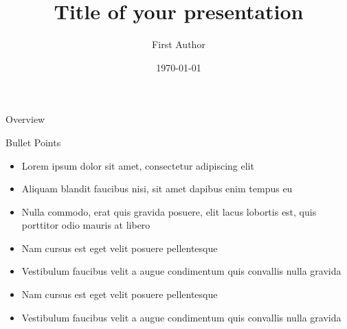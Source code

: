 \documentclass[aspectratio=169,xcolor=dvipsnames, t]{beamer}
\title[short title]{Title of your presentation} %
\author{First Author}
\institute[Título Corto]{Facultad de Ingeniería
\newline
Universidad El Bosque
}
\date{\today} %
\let\oldsection\section
\renewcommand{\section}[2][\relax]{%
    \ifx#1\relax
      \oldsection{#2}%
    \else
      \oldsection[#1]{#2}%
    \fi%
    \label{sec:\thesection}%
}
\begin{document}
\maketitlepage
\begin{frame}[t]{Overview}
    \tableofcontents
\end{frame}




\begin{frame}{Bullet Points}
    \begin{itemize}
        \item Lorem ipsum dolor sit amet, consectetur adipiscing elit
        \item Aliquam blandit faucibus nisi, sit amet dapibus enim tempus eu
        \item Nulla commodo, erat quis gravida posuere, elit lacus lobortis est, quis porttitor odio mauris at libero
        \item Nam cursus est eget velit posuere pellentesque
        \item Vestibulum faucibus velit a augue condimentum quis convallis nulla gravida
        \item Nam cursus est eget velit posuere pellentesque
        \item Vestibulum faucibus velit a augue condimentum quis convallis nulla gravida
    \end{itemize}
\end{frame}
\end{document}
